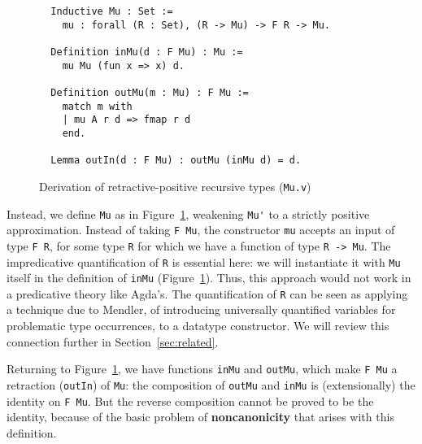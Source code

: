 \documentclass[a4paper,USenglish]{lipics-v2021}
\begin{document}
\begin{figure}
\begin{verbatim}
  Inductive Mu : Set :=
    mu : forall (R : Set), (R -> Mu) -> F R -> Mu.

  Definition inMu(d : F Mu) : Mu :=
    mu Mu (fun x => x) d.

  Definition outMu(m : Mu) : F Mu :=
    match m with
    | mu A r d => fmap r d
    end.

  Lemma outIn(d : F Mu) : outMu (inMu d) = d.
\end{verbatim}
\caption{Derivation of retractive-positive recursive types (\texttt{Mu.v})}
\label{fig:mu}
\end{figure}

Instead, we define \verb|Mu| as in Figure~\ref{fig:mu}, weakening
\verb|Mu'| to a strictly positive approximation. Instead of taking
\verb|F Mu|, the constructor \verb|mu| accepts an input of type
\verb|F R|, for some type \verb|R| for which we have a function of type
\verb|R -> Mu|.  The impredicative quantification of \verb|R| is
essential here: we will instantiate it with \verb|Mu| itself in the
definition of \verb|inMu| (Figure~\ref{fig:mu}).  Thus, this approach
would not work in a predicative theory like Agda's.  The
quantification of \verb|R| can be seen as applying a technique due to
Mendler, of introducing universally quantified variables for
problematic type occurrences, to a datatype constructor.  We will
review this connection further in Section~\ref{sec:related}.

Returning to Figure~\ref{fig:mu}, we have functions \verb|inMu| and
\verb|outMu|, which make \verb|F Mu| a retraction (\verb|outIn|) of
\verb|Mu|: the composition of \verb|outMu| and \verb|inMu| is
(extensionally) the identity on \verb|F Mu|.  But the reverse
composition cannot be proved to be the identity, because of the basic
problem of \textbf{noncanonicity} that arises with this definition.
\end{document}
